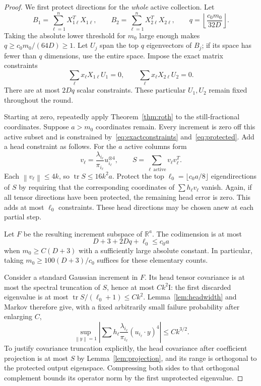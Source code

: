 \documentclass[11pt]{article}
\theoremstyle{remark}\newtheorem{remark}[theorem]{Remark}
\newcommand{\R}{\mathbb R}\newcommand{\E}{\mathbb E}\newcommand{\Prob}{\mathbb P}
\newcommand{\Tr}{\operatorname{tr}}\newcommand{\rank}{\operatorname{rank}}
\newcommand{\norm}[1]{\left\lVert#1\right\rVert}\newcommand{\abs}[1]{\left|#1\right|}
\newcommand{\Id}{\mathrm I}\newcommand{\dbar}{\bar d}
\numberwithin{equation}{section}
\begin{document}
\begin{proof}
We first protect directions for the \emph{whole} active collection. Let
\[
 B_1=\sum_{\ell=1}^nX_{1\ell}^TX_{1\ell},\qquad
 B_2=\sum_{\ell=1}^nX_{2\ell}^TX_{2\ell},\qquad
 q=\left\lfloor\frac{c_0m_0}{32D}\right\rfloor.
\]
Taking the absolute lower threshold for $m_0$ large enough makes $q\ge c_0m_0/(64D)\ge1$. Let $U_j$ span the top $q$ eigenvectors of $B_j$; if its space has fewer than $q$ dimensions, use the entire space. Impose the exact matrix constraints
\begin{equation}\label{eq:protected}
 \sum_\ell x_\ell X_{1\ell}U_1=0,\qquad
 \sum_\ell x_\ell X_{2\ell}U_2=0.
\end{equation}
There are at most $2Dq$ scalar constraints. These particular $U_1,U_2$ remain fixed throughout the round.

Starting at zero, repeatedly apply Theorem~\ref{thm:roth} to the still-fractional coordinates. Suppose $a>m_0$ coordinates remain. Every increment is zero off this active subset and is constrained by~\eqref{eq:exactconstraints} and~\eqref{eq:protected}. Add a head constraint as follows. For the $a$ active columns form
\[
 v_\ell=\frac{\lambda_{i_\ell}}{\pi_{i_\ell}}u_{i_\ell}^{\otimes4},\qquad
 S=\sum_{\ell\ \mathrm{active}}v_\ell v_\ell^T.
\]
Each $\norm{v_\ell}\le4k$, so $\Tr S\le16k^2a$. Protect the top
$\ell_0=\lfloor c_0a/8\rfloor$ eigendirections of $S$ by requiring that the corresponding coordinates of $\sum h_\ell v_\ell$ vanish. Again, if all tensor directions have been protected, the remaining head error is zero. This adds at most $\ell_0$ constraints. These head directions may be chosen anew at each partial step.

Let $F$ be the resulting increment subspace of $\R^a$. The codimension is at most
\[
 D+3+2Dq+\ell_0\le c_0a
\]
when $m_0\ge C(D+3)$ with a sufficiently large absolute constant. In particular, taking $m_0\ge100(D+3)/c_0$ suffices for these elementary counts.

Consider a standard Gaussian increment in $F$. Its head tensor covariance is at most the spectral truncation of $S$, hence at most $Ck^2\Id$: the first discarded eigenvalue is at most $\Tr S/(\ell_0+1)\le Ck^2$. Lemma~\ref{lem:headwidth} and Markov therefore give, with a fixed arbitrarily small failure probability after enlarging $C$,
\begin{equation}\label{eq:headpartial}
 \sup_{\norm y=1}\abs{\sum h_\ell\frac{\lambda_{i_\ell}}{\pi_{i_\ell}}
 (u_{i_\ell}\cdot y)^4}\le Ck^{3/2}.
\end{equation}
To justify covariance truncation explicitly, the head covariance after coefficient projection is at most $S$ by Lemma~\ref{lem:projection}, and its range is orthogonal to the protected output eigenspace. Compressing both sides to that orthogonal complement bounds its operator norm by the first unprotected eigenvalue.


\end{proof}
\end{document}
